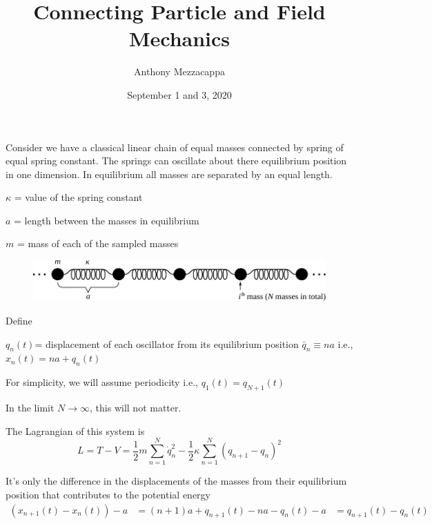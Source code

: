 \documentclass{article}
\title{Connecting Particle and Field Mechanics}
\author{Anthony Mezzacappa}
\date{September 1 and 3, 2020}
\begin{document}
\setlength{\parskip}{1em}

\maketitle

\noindent Consider we have a classical linear chain of equal masses connected by spring of equal spring constant. The springs can oscillate about there equilibrium position in one dimension. In equilibrium all masses are separated by an equal length. \par

$\kappa$ = value of the spring constant \par
$a$ = length between the masses in equilibrium\par
$m$ = mass of each of the sampled masses\par

\begin{figure}[h!]
    \centering
    \includegraphics[width=\textwidth]{pics/04-linear-chain.pdf}
    \label{fig:l4-linear-chain}
\end{figure}

\noindent Define \par
\noindent $q_n(t) $= displacement of each oscillator from its equilibrium position $\bar{q}_n \equiv na $ i.e., $x_n(t) = na+q_n(t)$ \par
\noindent For simplicity, we will assume periodicity i.e., $q_1(t) =q_{N+1}(t)$ \par
\noindent In the limit $N \rightarrow \infty$, this will not matter. \par


\noindent The Lagrangian of this system is
\begin{equation}
    L = T - V  = \frac{1}{2} m \sum_{n=1}^N \dot{q}_n^2 - \frac{1}{2} \kappa \sum_{n=1}^N (q_{n+1} - q_n)^2
\end{equation}

\noindent It's only the difference in the displacements of the masses from their equilibrium position that contributes to the potential energy
\begin{align*}
    \left( x_{n+1} (t) - x_n (t) \right) - a &= ( n + 1 ) a + q_{n+1} (t) - n a - q_n (t) - a 
    &= q_{n+1} (t) - q_n (t)
\end{align*}
\end{document}
